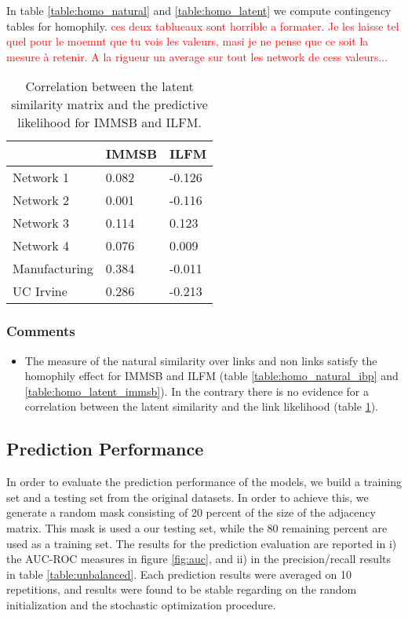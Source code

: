 \documentclass[a4paper, 12pt]{article}
\begin{document}
In table \ref{table:homo_natural} and \ref{table:homo_latent} we compute contingency tables for homophily.
\textcolor{red}{ces deux tablueaux sont horrible a formater. Je les laisse tel quel pour le moemnt que tu vois les valeurs, masi je ne pense que ce soit la mesure à retenir. A la rigueur un average sur tout les network de cess valeurs...}




\begin{table}[h]
    \caption{Correlation between the latent similarity matrix and the predictive likelihood for IMMSB and ILFM.}
    \centering
    \begin{tabular}{lll}
    \hline
    & IMMSB  & ILFM \\
    \hline
    Network 1     & 0.082 &  -0.126   \\
    Network 2     & 0.001     &  -0.116   \\
    Network 3     & 0.114     &  0.123    \\
    Network 4     & 0.076     &  0.009    \\
    Manufacturing & 0.384     &  -0.011   \\
    UC Irvine     & 0.286     &  -0.213   \\
    \hline
    \end{tabular}
    \label{table:homo_pearson}
\end{table}


\subsubsection{Comments}
\begin{itemize}
    \item The measure of the natural similarity over links and non links satisfy the homophily effect for IMMSB and ILFM (table \ref{table:homo_natural_ibp} and \ref{table:homo_latent_immsb}). In the contrary there is no evidence for a correlation between the latent similarity and the link likelihood (table \ref{table:homo_pearson}). 
\end{itemize}


\subsection{Prediction Performance}
In order to evaluate the  prediction performance of the models, we build a training set and a testing set from the original datasets. In order to achieve this, we generate a random mask consisting of 20 percent of the size of the adjacency matrix. This mask is used a our testing set, while the 80 remaining percent are used as a training set. The results for the prediction evaluation are reported in i) the AUC-ROC measures in figure \ref{fig:auc}, and ii) in the precision/recall results in table \ref{table:unbalanced}.
Each prediction results were averaged on 10 repetitions, and results were found to be stable regarding on the random  initialization and the stochastic optimization procedure. 
\end{document}
